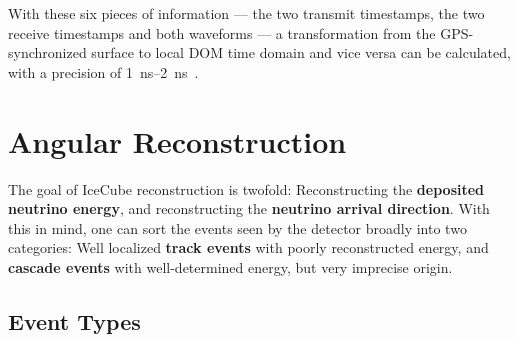 With these six pieces of information --- the two transmit timestamps, the two receive timestamps and both waveforms --- a transformation from the GPS-synchronized surface to local DOM time domain and vice versa can be calculated, with a precision of \SIrange{1}{2}{\ns}~\cite{Abbasi2009}.

\section{Angular Reconstruction}\label{reconstruction}

The goal of IceCube reconstruction is twofold: Reconstructing the \textbf{deposited neutrino energy}, and reconstructing the \textbf{neutrino arrival direction}. With this in mind, one can sort the events seen by the detector broadly into two categories: Well localized \textbf{track events} with poorly reconstructed energy, and \textbf{cascade events} with well-determined energy, but very imprecise origin.

\subsection{Event Types}\label{ic_event_types}

